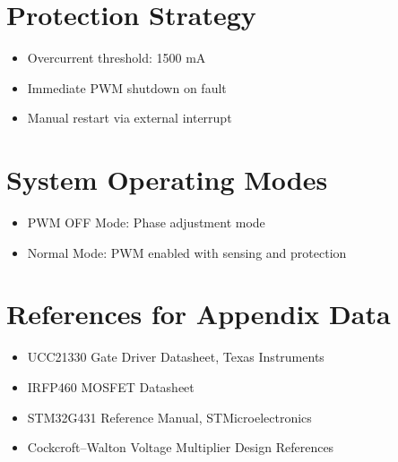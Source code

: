 \vspace{0.3cm}

\section{Protection Strategy}

\begin{itemize}
    \item Overcurrent threshold: 1500 mA  
    \item Immediate PWM shutdown on fault  
    \item Manual restart via external interrupt  
\end{itemize}

\vspace{0.3cm}

\section{System Operating Modes}

\begin{itemize}
    \item PWM OFF Mode: Phase adjustment mode  
    \item Normal Mode: PWM enabled with sensing and protection  
\end{itemize}

\vspace{0.3cm}

\section{References for Appendix Data}

\begin{itemize}
    \item UCC21330 Gate Driver Datasheet, Texas Instruments  
    \item IRFP460 MOSFET Datasheet  
    \item STM32G431 Reference Manual, STMicroelectronics  
    \item Cockcroft--Walton Voltage Multiplier Design References  
\end{itemize}